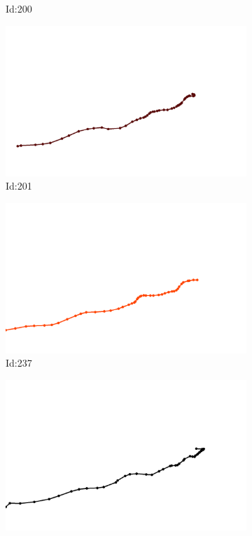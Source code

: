 \documentclass[12pt,twoside]{report}
\begin{document}
\begin{figure}
\begin{subfigure}[b]{0.20\textwidth}
\caption{Id:200}
\end{subfigure}
\begin{subfigure}[b]{0.20\textwidth}
\centering
\includegraphics[width=\textwidth]{../trajectories/201.png}
\caption{Id:201}
\end{subfigure}
\begin{subfigure}[b]{0.20\textwidth}
\centering
\includegraphics[width=\textwidth]{../trajectories/237.png}
\caption{Id:237}
\end{subfigure}
\begin{subfigure}[b]{0.20\textwidth}
\centering
\includegraphics[width=\textwidth]{../trajectories/238.png}

\end{subfigure}
\end{figure}
\end{document}
